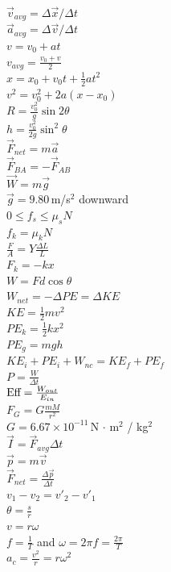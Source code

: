 \documentclass[letterpaper,addpoints,answers]{exam}
\begin{document}
 \fontseries{\seriesdefault}
 \begin{multicols}{2}
 \normalsize
 \noindent
 $\vec{v}_{avg} = \Delta\vec{x} / \Delta t$ \\
 $\vec{a}_{avg} = \Delta\vec{v} / \Delta t$ \\
 $v = v_0 + a t$ \\
 $v_{avg} = \frac{v_0 + v}{2}$ \\
 $x = x_0 + v_0 t + \frac{1}{2} a t^2$ \\
 $v^2 = v_0^2 + 2 a (x - x_0)$ \\
 $R = \frac{v_0^2}{g}\sin 2\theta$ \\
 $h = \frac{v_0^2}{2 g} \sin^2 \theta$ \\
 $\vec{F}_{net} = m \vec{a}$ \\
 $\vec{F}_{BA} = - \vec{F}_{AB}$ \\
 $\vec{W} = m \vec{g}$ \\
 $\vec{g} = 9.80\,$m/s$^2$ downward \\
 $0 \le f_s \le \mu_s N$ \\
 $f_k = \mu_k N$ \\
 $\frac{F}{A} = Y \frac{\Delta L}{L}$ \\
 $F_k = -k x$ \\
 $W = F d \cos\theta$ \\
 $W_{net} = -\Delta PE = \Delta KE$ \\
 $KE = \frac{1}{2} m v^2$ \\
 $PE_k = \frac{1}{2} k x^2$ \\
 $PE_g = m g h$ \\
 $KE_i + PE_i + W_{nc} = KE_f + PE_f$ \\
 $P = \frac{W}{\Delta t}$ \\
 $\hbox{Eff} = \frac{W_{out}}{E_{in}}$ \\
 $F_G = G \frac{m M}{r^2}$ \\
 $G = 6.67 \times 10^{-11}\,$N $\cdot$ m$^2$ / kg$^2$ \\
 $\vec{I} = \vec{F}_{avg} \Delta t$ \\
 $\vec{p} = m \vec{v}$ \\
 $\vec{F}_{net} = \frac{\Delta \vec{p}}{\Delta t}$ \\
 $v_1 - v_2 = v'_2 - v'_1$ \\
 $\theta = \frac{s}{r}$ \\
 $v = r \omega$ \\
 $f = \frac{1}{T}$ and $\omega = 2 \pi f = \frac{2 \pi}{T}$ \\
 $a_c = \frac{v^2}{r} = r \omega^2$ \\

\end{multicols}
\end{document}
